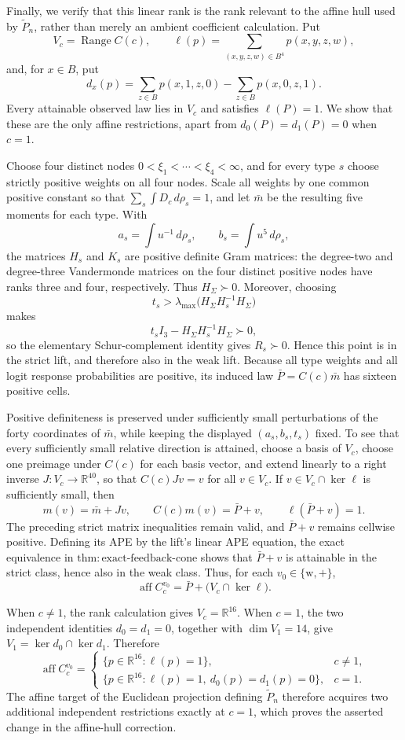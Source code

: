 Finally, we verify that this linear rank is the rank relevant to the affine
hull used by \(\widetilde P_n\), rather than merely an ambient coefficient
calculation.  Put
\[
 V_c=\operatorname{Range}C(c),\qquad
 \ell(p)=\sum_{(x,y,z,w)\in B^4}p(x,y,z,w),
\]
and, for \(x\in B\), put
\[
 d_x(p)=\sum_{z\in B}p(x,1,z,0)
       -\sum_{z\in B}p(x,0,z,1).
\]
Every attainable observed law lies in \(V_c\) and satisfies \(\ell(P)=1\).
We show that these are the only affine restrictions, apart from
\(d_0(P)=d_1(P)=0\) when \(c=1\).

Choose four distinct nodes \(0<\xi_1<\cdots<\xi_4<\infty\), and for every
type \(s\) choose strictly positive weights on all four nodes.  Scale all
weights by one common positive constant so that
\(\sum_s\int D_c\,d\rho_s=1\), and let \(\bar m\) be the resulting five
moments for each type.  With
\[
 a_s=\int u^{-1}\,d\rho_s,
 \qquad b_s=\int u^5\,d\rho_s,
\]
the matrices \(H_s\) and \(K_s\) are positive definite Gram matrices: the
degree-two and degree-three Vandermonde matrices on the four distinct
positive nodes have ranks three and four, respectively.  Thus
\(H_\Sigma\succ0\).  Moreover, choosing
\[
 t_s>\lambda_{\max}
 \bigl(H_\Sigma H_s^{-1}H_\Sigma\bigr)
\]
makes
\[
 t_sI_3-H_\Sigma H_s^{-1}H_\Sigma\succ0,
\]
so the elementary Schur-complement identity gives \(R_s\succ0\).  Hence this
point is in the strict lift, and therefore also in the weak lift.  Because all
type weights and all logit response probabilities are positive, its induced
law \(\bar P=C(c)\bar m\) has sixteen positive cells.

Positive definiteness is preserved under sufficiently small perturbations of
the forty coordinates of \(\bar m\), while keeping the displayed
\((a_s,b_s,t_s)\) fixed.  To see that every sufficiently small relative
direction is attained, choose a basis of \(V_c\), choose one preimage under
\(C(c)\) for each basis vector, and extend linearly to a right inverse
\(J:V_c\to\mathbb R^{40}\), so that \(C(c)Jv=v\) for all \(v\in V_c\).
If \(v\in V_c\cap\ker\ell\) is sufficiently small, then
\[
 m(v)=\bar m+Jv,
 \qquad C(c)m(v)=\bar P+v,
 \qquad \ell(\bar P+v)=1.
\]
The preceding strict matrix inequalities remain valid, and
\(\bar P+v\) remains cellwise positive.  Defining its APE by the lift's
linear APE equation, the exact equivalence in
\(\mathrm{thm{:}exact\text{-}feedback\text{-}cone}\) shows that
\(\bar P+v\) is attainable in the strict class, hence also in the weak class.
Thus, for each \(v_0\in\{\mathrm w,+\}\),
\[
 \operatorname{aff}C_c^{v_0}
 =\bar P+\bigl(V_c\cap\ker\ell\bigr).
\]

When \(c\ne1\), the rank calculation gives \(V_c=\mathbb R^{16}\).  When
\(c=1\), the two independent identities \(d_0=d_1=0\), together with
\(\dim V_1=14\), give
\(V_1=\ker d_0\cap\ker d_1\).  Therefore
\[
 \operatorname{aff}C_c^{v_0}
 =\begin{cases}
 \{p\in\mathbb R^{16}:\ell(p)=1\},&c\ne1,\\
 \{p\in\mathbb R^{16}:\ell(p)=1,\ d_0(p)=d_1(p)=0\},&c=1.
 \end{cases}
\]
The affine target of the Euclidean projection defining \(\widetilde P_n\)
therefore acquires two additional independent restrictions exactly at
\(c=1\), which proves the asserted change in the affine-hull correction.
